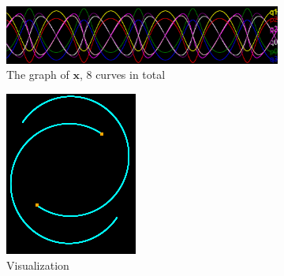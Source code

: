 \documentclass[12pt]{article}
\begin{document}
\begin{figure}[h]
  \centering
  \begin{subfigure}[b]{0.6\linewidth}
    \includegraphics[width=\linewidth]{kepler_2_body_graph.png}
    \caption{The graph of $\mathbf x$, 8 curves in total}
  \end{subfigure}
  \begin{subfigure}[b]{0.15\linewidth}
    \includegraphics[width=\linewidth]{kepler_2_body_trace.png}
    \caption{Visualization}
  \end{subfigure}
  \begin{subfigure}[b]{0.2\linewidth}

\end{subfigure}
\end{figure}
\end{document}
